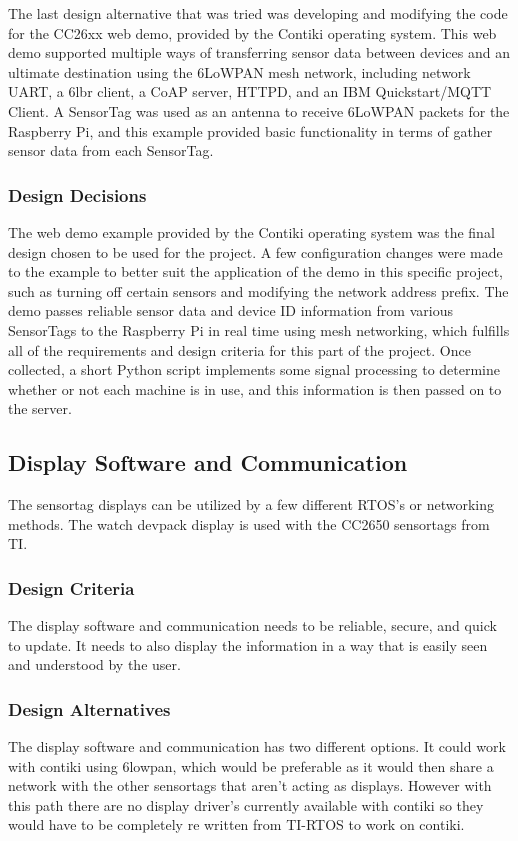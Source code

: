 \documentclass[PPFS.tex]{template/subfiles}
\begin{document}
The last design alternative that was tried was developing and modifying the code for the CC26xx web demo, provided by the Contiki operating system. This web demo supported multiple ways of transferring sensor data between devices and an ultimate destination using the 6LoWPAN mesh network, including network UART, a 6lbr client, a CoAP server, HTTPD, and an IBM Quickstart/MQTT Client. A SensorTag was used as an antenna to receive 6LoWPAN packets for the Raspberry Pi, and this example provided basic functionality in terms of gather sensor data from each SensorTag.

\subsubsection{Design Decisions}
The web demo example provided by the Contiki operating system was the final design chosen to be used for the project. A few configuration changes were made to the example to better suit the application of the demo in this specific project, such as turning off certain sensors and modifying the network address prefix. The demo passes reliable sensor data and device ID information from various SensorTags to the Raspberry Pi in real time using mesh networking, which fulfills all of the requirements and design criteria for this part of the project. Once collected, a short Python script implements some signal processing to determine whether or not each machine is in use, and this information is then passed on to the server.

\subsection{Display Software and Communication}
The sensortag displays can be utilized by a few different RTOS's or networking methods. The watch devpack display is used with the CC2650 sensortags from TI. 

\subsubsection{Design Criteria}
The display software and communication needs to be reliable, secure, and quick to update. It needs to also display the information in a way that is easily seen and understood by the user. 

\subsubsection{Design Alternatives}
The display software and communication has two different options. It could work with contiki using 6lowpan, which would be preferable as it would then share a network with the other sensortags that aren't acting as displays. However with this path there are no display driver's currently available with contiki so they would have to be completely re written from TI-RTOS to work on contiki. 
\end{document}
